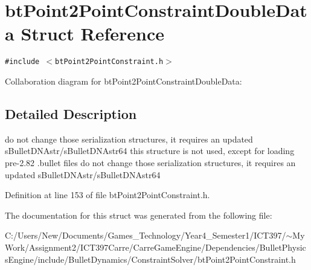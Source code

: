 \hypertarget{structbt_point2_point_constraint_double_data}{
\section{btPoint2PointConstraintDoubleData Struct Reference}
\label{structbt_point2_point_constraint_double_data}
}
{\tt \#include $<$btPoint2PointConstraint.h$>$}

Collaboration diagram for btPoint2PointConstraintDoubleData:

\subsection{Detailed Description}
do not change those serialization structures, it requires an updated sBulletDNAstr/sBulletDNAstr64 this structure is not used, except for loading pre-2.82 .bullet files do not change those serialization structures, it requires an updated sBulletDNAstr/sBulletDNAstr64 

Definition at line 153 of file btPoint2PointConstraint.h.

The documentation for this struct was generated from the following file:\begin{CompactItemize}
\item 
C:/Users/New/Documents/Games\_\-Technology/Year4\_\-Semester1/ICT397/$\sim$My Work/Assignment2/ICT397Carre/CarreGameEngine/Dependencies/BulletPhysicsEngine/include/BulletDynamics/ConstraintSolver/btPoint2PointConstraint.h\end{CompactItemize}
